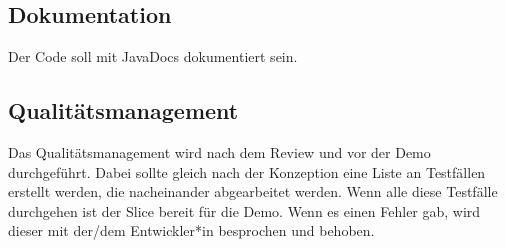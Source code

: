 \subsection{Dokumentation}

Der Code soll mit JavaDocs dokumentiert sein.

\subsection{Qualitätsmanagement}

Das Qualitätsmanagement wird nach dem Review und vor der Demo durchgeführt. Dabei sollte gleich nach der Konzeption eine Liste an Testfällen erstellt werden, die nacheinander abgearbeitet werden. Wenn alle diese Testfälle durchgehen ist der Slice bereit für die Demo. Wenn es einen Fehler gab, wird dieser mit der/dem Entwickler*in besprochen und behoben.